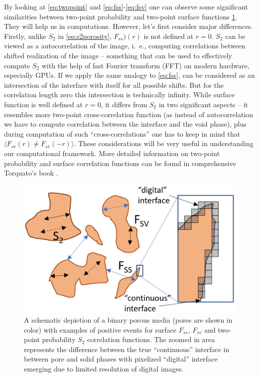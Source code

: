 \documentclass[reprint,amsmath,amssymb,aps,pre]{revtex4-1}
\begin{document}
By looking at \cref{eq:twopoint} and \cref{eq:fss}-\cref{eq:fsv} one can observe
some significant similarities between two-point probability and two-point
surface functions \cref{fig:scheme}. They will help us in computations. However,
let's first consider major differences. Firstly, unlike $S_2$ in
\cref{eq:s2porosity}, $F_{ss})(r)$ is not defined at $r=0$. $S_2$ can be viewed
as a autocorrelation of the image, i.~e., computing correlations between shifted
realization of the image -- something that can be used to effectively compute
$S_2$ with the help of fast Fourier transform (FFT) on modern hardware,
especially GPUs. If we apply the same analogy to \cref{eq:fss}, can be
considered as an intersection of the interface with itself for all possible
shifts. But for the correlation length zero this intersection is technically
infinity. While surface function is well defined at $r=0$, it differs from $S_2$
in two significant aspects -- it resembles more two-point cross-correlation
function (as instead of autocorrelation we have to compute correlation between
the interface and the void phase), plus during computation of such
``cross-correlations'' one has to keep in mind that
$\langle F_{sv}(r) \ne F_{sv}(-r) \rangle$. These considerations will be very
useful in understanding our computational framework. More detailed information
on two-point probability and surface correlation functions can be found in
comprehensive Torquato's book \cite{Torq_book}.

\begin{figure}[ht]
  \centering
  \includegraphics[width=0.9\linewidth]{images/scheme.png}
  \caption[]{A schematic depiction of a binary porous media (pores are shown in
    color) with examples of positive events for surface $F_{ss}$, $F_{sv}$ and
    two-point probability $S_2$ correlation functions. The zoomed in area
    represents the difference between the true ``continuous'' interface in
    between pore and solid phases with pixelized ``digital'' interface emerging
    due to limited resolution of digital images.}
  \label{fig:scheme}
\end{figure}
\end{document}
